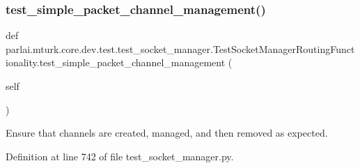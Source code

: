 \subsubsection{\texorpdfstring{test\+\_\+simple\+\_\+packet\+\_\+channel\+\_\+management()}{test\_simple\_packet\_channel\_management()}}
{\footnotesize\ttfamily def parlai.\+mturk.\+core.\+dev.\+test.\+test\+\_\+socket\+\_\+manager.\+Test\+Socket\+Manager\+Routing\+Functionality.\+test\+\_\+simple\+\_\+packet\+\_\+channel\+\_\+management (\begin{DoxyParamCaption}\item[{}]{self }\end{DoxyParamCaption})}

\begin{DoxyVerb}Ensure that channels are created, managed, and then removed as expected.
\end{DoxyVerb}
 

Definition at line 742 of file test\+\_\+socket\+\_\+manager.\+py.


